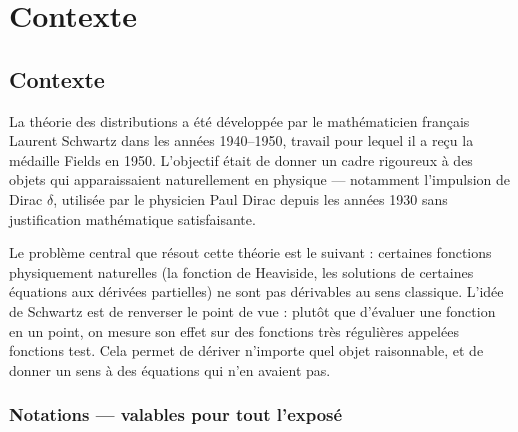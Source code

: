 \documentclass[12pt,a4paper,openany]{book}
\theoremstyle{definition}
\theoremstyle{plain}
\theoremstyle{remark}
\begin{document}
	\pagestyle{empty}
	\setcounter{page}{1}
	

	\frontmatter
	\tableofcontents
	
	 
	\listoffigures
	\pagestyle{fancy}
	
	\mainmatter
	
	\chapter*{Contexte}
	
	\section*{Contexte}
	
	La théorie des distributions a été développée par le mathématicien français Laurent Schwartz dans les années 1940–1950, travail pour lequel il a reçu la médaille Fields en 1950. L'objectif était de donner un cadre rigoureux à des objets qui apparaissaient naturellement en physique — notamment l'impulsion de Dirac $\delta$, utilisée par le physicien Paul Dirac depuis les années 1930 sans justification mathématique satisfaisante.
	
	Le problème central que résout cette théorie est le suivant : certaines fonctions physiquement naturelles (la fonction de Heaviside, les solutions de certaines équations aux dérivées partielles) ne sont pas dérivables au sens classique. L'idée de Schwartz est de renverser le point de vue : plutôt que d'évaluer une fonction en un point, on mesure son effet sur des fonctions très régulières appelées fonctions test. Cela permet de dériver n'importe quel objet raisonnable, et de donner un sens à des équations qui n'en avaient pas.
	\newpage
	\subsection*{Notations — valables pour tout l'exposé}
	
\end{document}
